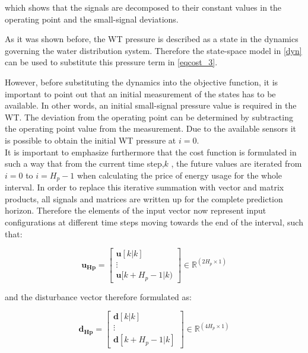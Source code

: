 which shows that the signals are decomposed to their constant values in the operating point and the small-signal deviations. 

As it was shown before, the WT pressure is described as a state in the dynamics governing the water distribution system. Therefore the state-space model in \eqref{dyn} can be used to substitute this pressure term in \eqref{eqcost_3}.

However, before substituting the dynamics into the objective function, it is important to point out that an initial measurement of the states has to be available. In other words, an initial small-signal pressure value is required in the WT. The deviation from the operating point can be determined by subtracting the operating point value from the measurement. 
Due to the available sensors it is possible to obtain the initial WT pressure at $i = 0$. 
\\
\newline
It is important to emphasize furthermore that the cost function is formulated in such a way that from the current time step,$k$ , the future values are iterated from $i = 0$ to $i = H_p - 1$ when calculating the price of energy usage for the whole interval. In order to replace this iterative summation with vector and matrix products, all signals and matrices are written up for the complete prediction horizon. Therefore the elements of the input vector now represent input configurations at different time steps moving towards the end of the interval, such that:

\begin{equation}
\bm{u_{Hp}} =  
 \begin{bmatrix}
  \bm{u}[k|k]\\
  \vdots  \\
  \bm{u}[k+H_p-1|k)   
 \end{bmatrix}
 \in \pmb{\mathbb{R}}^{(2 H_p \times 1)}
 \label{eq:uhp}
\end{equation}

and the disturbance vector therefore formulated as:

\begin{equation}
\bm{d_{Hp}} =  
 \begin{bmatrix}
  \bm{d}[k|k]\\
  \vdots  \\
  \bm{d}[k+H_p-1|k]   
 \end{bmatrix}
 \in \pmb{\mathbb{R}}^{(4 H_p \times 1)}
 \label{eq:dhp}
\end{equation}

